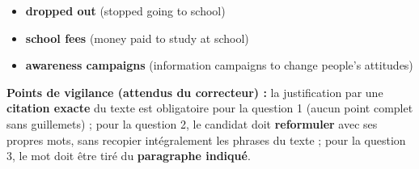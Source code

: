 \documentclass[11pt]{article}
\begin{document}
\begin{corrige}
\begin{itemize}
\item[a.] \textbf{dropped out} (stopped going to school)
\item[b.] \textbf{school fees} (money paid to study at school)
\item[c.] \textbf{awareness campaigns} (information campaigns to change people's attitudes)
\end{itemize}

\textbf{Points de vigilance (attendus du correcteur) :} la justification par une \textbf{citation exacte} du texte est obligatoire pour la question 1 (aucun point complet sans guillemets) ; pour la question 2, le candidat doit \textbf{reformuler} avec ses propres mots, sans recopier intégralement les phrases du texte ; pour la question 3, le mot doit être tiré du \textbf{paragraphe indiqué}.
\end{corrige}
\end{document}
